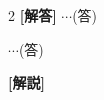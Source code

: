 \documentclass[../../main.tex]{subfiles}
\begin{document}
\setcounter{equation}{0}
\begin{oframed}
  
\end{oframed}
\setlength{\columnseprule}{0.4pt}
\begin{multicols}{2}
  {\bf [解答]}
  $\cdots$(答)

  $\cdots$(答)

  {\bf [解説]}

  \newpage
\end{multicols}
\end{document}
